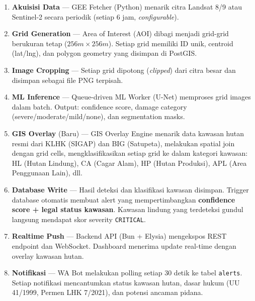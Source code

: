 \documentclass[11pt,a4paper]{article}
\begin{document}
\begin{enumerate}
    \item \textbf{Akuisisi Data} --- GEE Fetcher (Python) menarik citra Landsat 8/9 atau Sentinel-2 secara periodik (setiap 6 jam, \textit{configurable}).
    \item \textbf{Grid Generation} --- Area of Interest (AOI) dibagi menjadi grid-grid berukuran tetap ($256m \times 256m$). Setiap grid memiliki ID unik, centroid (lat/lng), dan polygon geometry yang disimpan di PostGIS.
    \item \textbf{Image Cropping} --- Setiap grid dipotong (\textit{clipped}) dari citra besar dan disimpan sebagai file PNG terpisah.
    \item \textbf{ML Inference} --- Queue-driven ML Worker (U-Net) memproses grid images dalam batch. Output: confidence score, damage category (severe/moderate/mild/none), dan segmentation masks.
    \item \textbf{GIS Overlay} (Baru) --- GIS Overlay Engine menarik data kawasan hutan resmi dari KLHK (SIGAP) dan BIG (Satupeta), melakukan spatial join dengan grid cells, mengklasifikasikan setiap grid ke dalam kategori kawasan: HL (Hutan Lindung), CA (Cagar Alam), HP (Hutan Produksi), APL (Area Penggunaan Lain), dll.
    \item \textbf{Database Write} --- Hasil deteksi dan klasifikasi kawasan disimpan. Trigger database otomatis membuat alert yang mempertimbangkan \textbf{confidence score + legal status kawasan}. Kawasan lindung yang terdeteksi gundul langsung mendapat skor severity \texttt{CRITICAL}.
    \item \textbf{Realtime Push} --- Backend API (Bun + Elysia) mengekspos REST endpoint dan WebSocket. Dashboard menerima update real-time dengan overlay kawasan hutan.
    \item \textbf{Notifikasi} --- WA Bot melakukan polling setiap 30 detik ke tabel \texttt{alerts}. Setiap notifikasi mencantumkan status kawasan hutan, dasar hukum (UU 41/1999, Permen LHK 7/2021), dan potensi ancaman pidana.
\end{enumerate}
\end{document}
